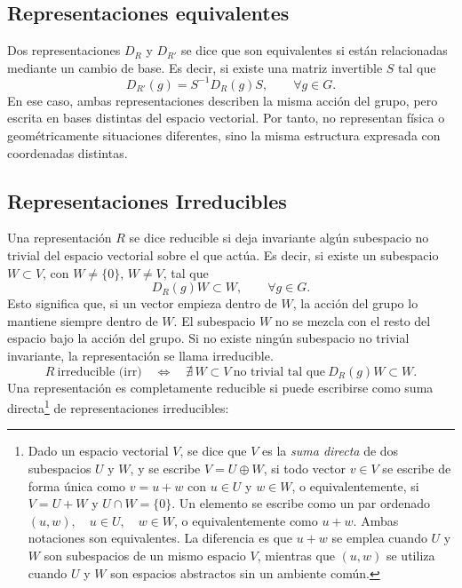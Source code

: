 \documentclass[a4paper,11pt]{book} %
\begin{document}
\subsection{Representaciones equivalentes}
\noindent
Dos representaciones \(D_R\) y \(D_{R'}\) se dice que son equivalentes si están
relacionadas mediante un cambio de base. Es decir, si existe una matriz
invertible \(S\) tal que
\begin{equation}
    D_{R'}(g)
    =
    S^{-1}D_R(g)S,
    \qquad
    \forall g\in G.
\end{equation}
\noindent
En ese caso, ambas representaciones describen la misma acción del grupo, pero
escrita en bases distintas del espacio vectorial. Por tanto, no representan
física o geométricamente situaciones diferentes, sino la misma estructura
expresada con coordenadas distintas.
\subsection{Representaciones Irreducibles}
\noindent
Una representación \(R\) se dice reducible si deja invariante algún subespacio
no trivial del espacio vectorial sobre el que actúa. Es decir, si existe un
subespacio \(W\subset V\), con $W \neq \{0\}$, $W \neq V$, tal que
\begin{equation}
    D_R(g)W \subset W,
    \qquad
    \forall g\in G.
\end{equation}
\noindent
Esto significa que, si un vector empieza dentro de \(W\), la acción del grupo
lo mantiene siempre dentro de \(W\). El subespacio \(W\) no se mezcla con el
resto del espacio bajo la acción del grupo.
\medskip\newline
Si no existe ningún subespacio no trivial invariante, la representación se
llama irreducible.
\begin{equation}
    R \ \text{irreducible (irr)}
    \quad
    \Longleftrightarrow
    \quad
    \nexists\, W\subset V
    \ \text{no trivial tal que}\
    D_R(g)W \subset W.
\end{equation}
\noindent
Una representación es completamente reducible si puede escribirse como suma directa\footnote{Dado un espacio vectorial $V$, se dice que $V$ es la \textit{suma directa}
de dos subespacios $U$ y $W$, y se escribe $V = U \oplus W$, si todo vector
$v \in V$ se escribe de forma única como $v = u + w$ con $u \in U$ y $w \in W$,
o equivalentemente, si $V = U + W$ y $U \cap W = \{0\}$. Un elemento se escribe como un par ordenado $(u, w), \quad u \in U, \quad w \in W$, o equivalentemente como  $u + w.$
Ambas notaciones son equivalentes. La diferencia es que $u + w$ se emplea cuando
$U$ y $W$ son subespacios de un mismo espacio $V$, mientras que $(u, w)$ se utiliza
cuando $U$ y $W$ son espacios abstractos sin un ambiente común.} de representaciones irreducibles:
\end{document}
